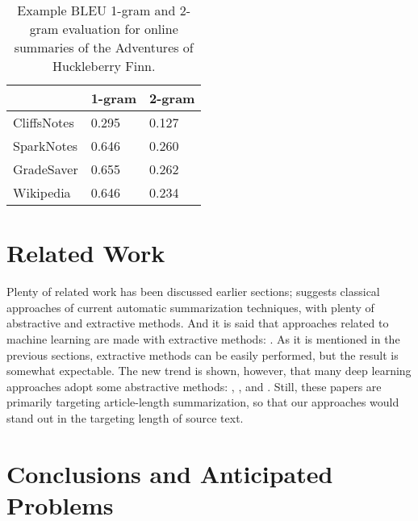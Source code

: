 \begin{table}[hbt]
	\centering
	\caption{Example BLEU 1-gram and 2-gram evaluation for online summaries of the Adventures of Huckleberry Finn.}\label{table:bleu_huckfinn}
	\begin{tabular}{l l l }
		\toprule
		\textbf{}   & \textbf{1-gram} & \textbf{2-gram} \\ \midrule
		CliffsNotes & 0.295           & 0.127           \\ \midrule
		SparkNotes  & 0.646           & 0.260           \\ \midrule
		GradeSaver  & 0.655           & 0.262           \\ \midrule
		Wikipedia   & 0.646           & 0.234           \\
		\bottomrule
	\end{tabular}
\end{table}

\section{Related Work}
Plenty of related work has been discussed earlier sections; \cite{Gaikwad2016} 
suggests classical approaches of current automatic summarization techniques, 
with plenty of abstractive and extractive methods. And it is said that 
approaches related to machine learning are made with extractive methods: 
\cite{2017arXiv170804439V}. As it is mentioned in the previous sections, 
extractive methods can be easily performed, but the result is somewhat 
expectable. The new trend is shown, however, that many deep learning approaches 
adopt some abstractive methods: \cite{2016arXiv160206023N}, 
\cite{2017arXiv170404368S}, and \cite{Rush2015}. Still, these papers are 
primarily targeting article-length summarization, so that our approaches would 
stand out in the targeting length of source text. 

\section{Conclusions and Anticipated Problems}


